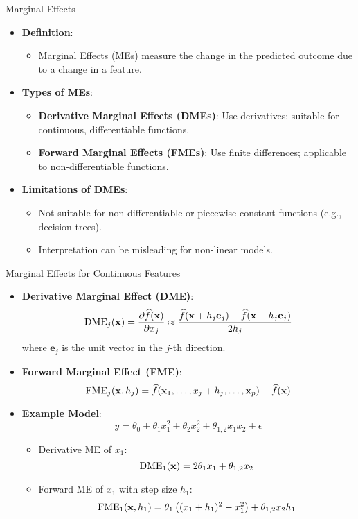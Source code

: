 \documentclass[11pt,compress,t,notes=noshow, aspectratio=169, xcolor=table]{beamer}
\begin{document}
\begin{frame}{Marginal Effects}
\begin{itemize}
\item \textbf{Definition}:
\begin{itemize}
  \item Marginal Effects (MEs) measure the change in the predicted outcome due to a change in a feature.
\end{itemize}
\item \textbf{Types of MEs}:
\begin{itemize}
  \item \textbf{Derivative Marginal Effects (DMEs)}: Use derivatives; suitable for continuous, differentiable functions.
  \item \textbf{Forward Marginal Effects (FMEs)}: Use finite differences; applicable to non-differentiable functions.
\end{itemize}
\item \textbf{Limitations of DMEs}:
\begin{itemize}
  \item Not suitable for non-differentiable or piecewise constant functions (e.g., decision trees).
  \item Interpretation can be misleading for non-linear models.
\end{itemize}
\end{itemize}
\end{frame}

\begin{frame}{Marginal Effects for Continuous Features}
\begin{itemize}
\item \textbf{Derivative Marginal Effect (DME)}:
\[
\text{DME}_j(\xv) = \frac{\partial \widehat{f}(\xv)}{\partial x_j} \approx \frac{\widehat{f}(\xv + h_j \mathbf{e}_j) - \widehat{f}(\xv - h_j \mathbf{e}_j)}{2h_j}
\]
where $\mathbf{e}_j$ is the unit vector in the $j$-th direction.
\item \textbf{Forward Marginal Effect (FME)}:
\[
\text{FME}_j(\xv, h_j) = \widehat{f}(\xv_1, \dots, x_j + h_j, \dots, \xv_p) - \widehat{f}(\xv)
\]
\item \textbf{Example Model}:
\[
y = \theta_0 + \theta_{1} x_1^2 + \theta_{2} x_2^2 + \theta_{1,2} x_1 x_2 + \epsilon
\]
\begin{itemize}
\item Derivative ME of $x_1$:
\[
\text{DME}_1(\xv) = 2\theta_1 x_1 + \theta_{1,2} x_2
\]
\item Forward ME of $x_1$ with step size $h_1$:
\[
\text{FME}_1(\xv, h_1) = \theta_1 \left( (x_1 + h_1)^2 - x_1^2 \right) + \theta_{1,2} x_2 h_1
\]
\end{itemize}
\end{itemize}
\end{frame}
\end{document}

